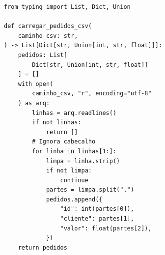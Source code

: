 \ifmostrarGabarito
\begin{verbatim}
from typing import List, Dict, Union

def carregar_pedidos_csv(
    caminho_csv: str,
) -> List[Dict[str, Union[int, str, float]]]:
    pedidos: List[
        Dict[str, Union[int, str, float]]
    ] = []
    with open(
        caminho_csv, "r", encoding="utf-8"
    ) as arq:
        linhas = arq.readlines()
        if not linhas:
            return []
        # Ignora cabecalho
        for linha in linhas[1:]:
            limpa = linha.strip()
            if not limpa:
                continue
            partes = limpa.split(",")
            pedidos.append({
                "id": int(partes[0]),
                "cliente": partes[1],
                "valor": float(partes[2]),
            })
    return pedidos
\end{verbatim}

\fi
